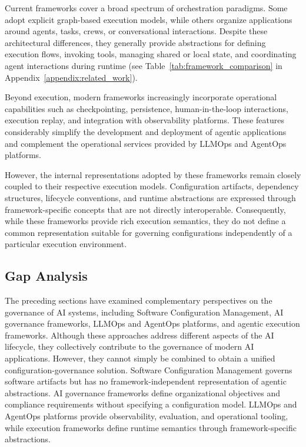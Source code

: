 \documentclass[10pt]{article}
\begin{document}
Current frameworks cover a broad spectrum of orchestration paradigms. Some adopt explicit graph-based execution models, while others organize applications around agents, tasks, crews, or conversational interactions. Despite these architectural differences, they generally provide abstractions for defining execution flows, invoking tools, managing shared or local state, and coordinating agent interactions during runtime (see Table~\ref{tab:framework_comparison} in Appendix~\ref{appendix:related_work}).

Beyond execution, modern frameworks increasingly incorporate operational capabilities such as checkpointing, persistence, human-in-the-loop interactions, execution replay, and integration with observability platforms. These features considerably simplify the development and deployment of agentic applications and complement the operational services provided by LLMOps and AgentOps platforms.

However, the internal representations adopted by these frameworks remain closely coupled to their respective execution models. Configuration artifacts, dependency structures, lifecycle conventions, and runtime abstractions are expressed through framework-specific concepts that are not directly interoperable. Consequently, while these frameworks provide rich execution semantics, they do not define a common representation suitable for governing configurations independently of a particular execution environment.



\subsection{Gap Analysis}
\label{sec:gap_analysis}

The preceding sections have examined complementary perspectives on the governance of AI systems, including Software Configuration Management, AI governance frameworks, LLMOps and AgentOps platforms, and agentic execution frameworks. Although these approaches address different aspects of the AI lifecycle, they collectively contribute to the governance of modern AI applications. However, they cannot simply be combined to obtain a unified configuration-governance solution. Software Configuration Management governs software artifacts but has no framework-independent representation of agentic abstractions. AI governance frameworks define organizational objectives and compliance requirements without specifying a configuration model. LLMOps and AgentOps platforms provide observability, evaluation, and operational tooling, while execution frameworks define runtime semantics through framework-specific abstractions. 
\end{document}
